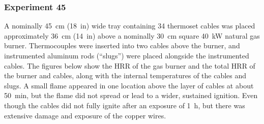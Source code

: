 \clearpage

\subsubsection{Experiment 45}

A nominally 45~cm (18~in) wide tray containing 34 thermoset cables was placed approximately 36~cm (14~in) above a nominally 30~cm square 40~kW natural gas burner. Thermocouples were inserted into two cables above the burner, and instrumented aluminum rods (``slugs'') were placed alongside the instrumented cables. The figures below show the HRR of the gas burner and the total HRR of the burner and cables, along with the internal temperatures of the cables and slugs. A small flame appeared in one location above the layer of cables at about 50~min, but the flame did not spread or lead to a wider, sustained ignition. Even though the cables did not fully ignite after an exposure of 1~h, but there was extensive damage and exposure of the copper wires.

